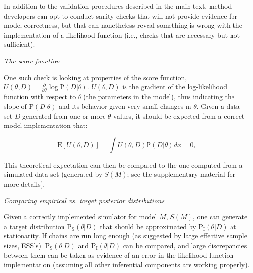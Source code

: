 \documentclass[oneside]{article}
\begin{document}
\vspace{.25cm}
\begin{tcolorbox}[breakable, width=\textwidth, colback=gray!10, boxrule=0pt,
  title=Box 2: Additional validation sanity-checks, fonttitle=\bfseries]
  \small

  In addition to the validation procedures described in the main text,
  method developers can opt to conduct sanity checks that will not
  provide evidence for model correctness, but that can nonetheless
  reveal something is wrong with the implementation of a likelihood
  function (i.e., checks that are necessary but not sufficient).
  
  \vspace{.25cm}
  \emph{The score function}
  
  One such check is looking at properties of the score function,
  $U(\theta,D)=\frac{\partial}{\partial\theta}\log
  \text{P}(D|\theta)$.
  $U(\theta,D)$ is the gradient of the log-likelihood function with
  respect to $\theta$ (the parameters in the model), thus indicating
  the slope of $\text{P}(D|\theta)$ and its behavior given very small
  changes in $\theta$.
  Given a data set $D$ generated from one or more $\theta$ values, it
  should be expected from a correct model implementation that:

  \begin{equation}\label{eq:scorefunction}
    \text{E}[U(\theta,D)] = \int U(\theta,D)\text{P}(D|\theta)dx = 0,
  \end{equation}


  This theoretical expectation can then be compared to the one
  computed from a simulated data set (generated by $S(M)$; see the
  supplementary material for more details).

  \vspace{.25cm}
  \emph{Comparing empirical vs. target posterior distributions}

  Given a correctly implemented simulator for model $M$, $S(M)$, one
  can generate a target distribution $\text{P}_{\text{S}}(\theta|D)$
  that should be approximated by $\text{P}_{\text{I}}(\theta|D)$ at stationarity.
  If chains are run long enough (as suggested by large effective
  sample sizes, ESS's), $\text{P}_{\text{S}}(\theta|D)$ and
  $\text{P}_{\text{I}}(\theta|D)$ can be compared, and large
  discrepancies between them can be taken as evidence of an error in the
  likelihood function implementation (assuming all other inferential
  components are working properly).


\end{tcolorbox}
\end{document}
